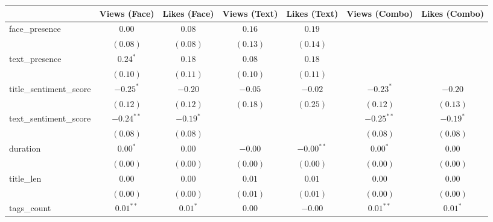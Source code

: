 
\begin{table}
\begin{center}
\begin{tabular}{l c c c c c c}
\hline
 & Views (Face) & Likes (Face) & Views (Text) & Likes (Text) & Views (Combo) & Likes (Combo) \\
\hline
face\_presence              & $0.00$          & $0.08$         & $0.16$          & $0.19$        &                 &                \\
                            & $(0.08)$        & $(0.08)$       & $(0.13)$        & $(0.14)$      &                 &                \\
text\_presence              & $0.24^{*}$      & $0.18$         & $0.08$          & $0.18$        &                 &                \\
                            & $(0.10)$        & $(0.11)$       & $(0.10)$        & $(0.11)$      &                 &                \\
title\_sentiment\_score     & $-0.25^{*}$     & $-0.20$        & $-0.05$         & $-0.02$       & $-0.23^{*}$     & $-0.20$        \\
                            & $(0.12)$        & $(0.12)$       & $(0.18)$        & $(0.25)$      & $(0.12)$        & $(0.13)$       \\
text\_sentiment\_score      & $-0.24^{**}$    & $-0.19^{*}$    &                 &               & $-0.25^{**}$    & $-0.19^{*}$    \\
                            & $(0.08)$        & $(0.08)$       &                 &               & $(0.08)$        & $(0.08)$       \\
duration                    & $0.00^{*}$      & $0.00$         & $-0.00$         & $-0.00^{**}$  & $0.00^{*}$      & $0.00$         \\
                            & $(0.00)$        & $(0.00)$       & $(0.00)$        & $(0.00)$      & $(0.00)$        & $(0.00)$       \\
title\_len                  & $0.00$          & $0.00$         & $0.01$          & $0.01$        & $0.00$          & $0.00$         \\
                            & $(0.00)$        & $(0.00)$       & $(0.01)$        & $(0.01)$      & $(0.00)$        & $(0.00)$       \\
tags\_count                 & $0.01^{**}$     & $0.01^{*}$     & $0.00$          & $-0.00$       & $0.01^{**}$     & $0.01^{*}$     \\

\end{tabular}
\end{center}
\end{table}
